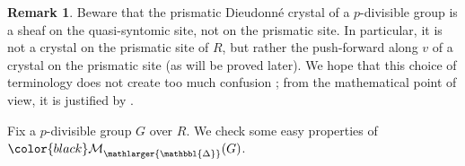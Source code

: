 \documentclass{amsart}
\newcommand{\prism}{{\mathlarger{\mathbbl{\Delta}}}}
\theoremstyle{plain}
\newtheorem{lemma}[theorem]{Lemma}
\theoremstyle{definition}
\newtheorem{remark}[theorem]{Remark}
\newcommand{\Fil}{\mathrm{Fil}}
\newcommand{\pris}{\mathrm{pris}}
\newcommand{\red}[1]{{\color{black} #1}}
\newcommand{\olive}[1]{{\color{black}#1}}
\begin{document}
\begin{remark}
Beware that the prismatic Dieudonn\'e crystal of a $p$-divisible group is a sheaf on the quasi-syntomic site, not on the prismatic site. In particular, it is not a crystal on the prismatic site of $R$, but rather the push-forward along $v$ of a crystal on the prismatic site (as will be proved later). We hope that this choice of terminology does not create too much confusion ; from the mathematical point of view, it is justified by .
\end{remark}


Fix a $p$-divisible group $G$ over $R$.
We check some easy properties of $\red{\mathcal{M}}_{\prism}(G)$.

%
%
\end{document}
